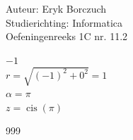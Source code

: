 \documentclass[a4paper]{article}
\begin{document}
  
\noindent \large Auteur: Eryk Borczuch \\
\noindent \large Studierichting: Informatica\\
\noindent \large Oefeningenreeks 1C nr. 11.2\\

\medskip

\normalsize

\noindent$-1$\\

$r = \sqrt{(-1)^2 + 0^2} = 1$\\

$\alpha = \pi$\\

$z = \operatorname{cis}(\pi)$\\



\begin{thebibliography}{999}
\end{thebibliography}
\end{document}
